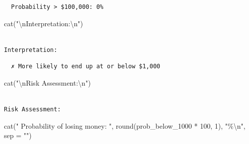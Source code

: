 \documentclass[
  letterpaper,
  DIV=11,
  numbers=noendperiod]{scrartcl}
\newenvironment{Shaded}{\begin{snugshade}}{\end{snugshade}}
\newcommand{\AttributeTok}[1]{\textcolor[rgb]{0.40,0.45,0.13}{#1}}
\newcommand{\ControlFlowTok}[1]{\textcolor[rgb]{0.00,0.23,0.31}{\textbf{#1}}}
\newcommand{\DecValTok}[1]{\textcolor[rgb]{0.68,0.00,0.00}{#1}}
\newcommand{\FloatTok}[1]{\textcolor[rgb]{0.68,0.00,0.00}{#1}}
\newcommand{\FunctionTok}[1]{\textcolor[rgb]{0.28,0.35,0.67}{#1}}
\newcommand{\NormalTok}[1]{\textcolor[rgb]{0.00,0.23,0.31}{#1}}
\newcommand{\SpecialCharTok}[1]{\textcolor[rgb]{0.37,0.37,0.37}{#1}}
\newcommand{\StringTok}[1]{\textcolor[rgb]{0.13,0.47,0.30}{#1}}
\begin{document}
\begin{verbatim}
  Probability > $100,000: 0%
\end{verbatim}

\begin{Shaded}
\begin{Highlighting}[]
\FunctionTok{cat}\NormalTok{(}\StringTok{"}\SpecialCharTok{\textbackslash{}n}\StringTok{Interpretation:}\SpecialCharTok{\textbackslash{}n}\StringTok{"}\NormalTok{)}
\end{Highlighting}
\end{Shaded}

\begin{verbatim}

Interpretation:
\end{verbatim}

\begin{Shaded}
\end{Shaded}

\begin{verbatim}
  ✗ More likely to end up at or below $1,000
\end{verbatim}

\begin{Shaded}
\begin{Highlighting}[]
\FunctionTok{cat}\NormalTok{(}\StringTok{"}\SpecialCharTok{\textbackslash{}n}\StringTok{Risk Assessment:}\SpecialCharTok{\textbackslash{}n}\StringTok{"}\NormalTok{)}
\end{Highlighting}
\end{Shaded}

\begin{verbatim}

Risk Assessment:
\end{verbatim}

\begin{Shaded}
\begin{Highlighting}[]
\FunctionTok{cat}\NormalTok{(}\StringTok{"  Probability of losing money: "}\NormalTok{, }\FunctionTok{round}\NormalTok{(prob\_below\_1000 }\SpecialCharTok{*} \DecValTok{100}\NormalTok{, }\DecValTok{1}\NormalTok{), }\StringTok{"\%}\SpecialCharTok{\textbackslash{}n}\StringTok{"}\NormalTok{, }\AttributeTok{sep =} \StringTok{""}\NormalTok{)}
\end{Highlighting}
\end{Shaded}
\end{document}
